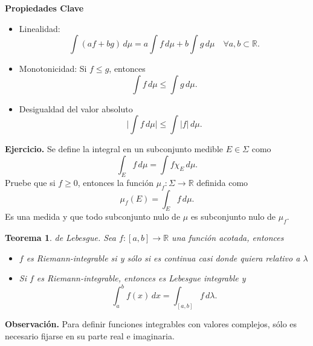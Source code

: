 \documentclass[letterpaper]{book}
\newtheorem{teorema}{Teorema}[section]
\newcommand{\exe}{{\noindent \sc \textbf{Ejercicio. }}}
\newcommand{\obs}{{\noindent \sc \textbf{Observación. }}}
\newcommand{\sig}{\ensuremath{\Sigma}}
\newcommand{\re}{\ensuremath{\mathbb R }}
\begin{document}
\noindent\textbf{Propiedades Clave}
\begin{itemize}
    \item Linealidad:
      \[
      \int (af + bg) \, d\mu = a\int f \, d\mu + b\int g \, d\mu\quad\forall{a,b}\subset\re.
      \]
    \item Monotonicidad: Si $f \leq g$, entonces
      \[
      \int f \, d\mu \leq \int g \, d\mu.
      \]
    \item Desigualdad del valor absoluto
      \[
      \Big|\int f \, d\mu\Big| \leq \int |f| \, d\mu.
      \]
\end{itemize}

\exe Se define la integral en un subconjunto medible $E\in\sig$ como
\[
\int_E f \, d\mu = \int f\chi_E\,d\mu.
\]
Pruebe que si $f\geq 0$, entonces la función $\mu_f:\sig\to\re$ definida como
\[
\mu_f(E)=\int_E f \, d\mu.
\]
Es una medida y que todo subconjunto nulo de $\mu$ es subconjunto nulo de $\mu_f$.
\begin{teorema}{de Lebesgue.}
Sea $f:[a,b]\to\re$ una función acotada, entonces
\begin{itemize}
  \item $f$ es Riemann-integrable si y sólo si es continua casi donde quiera relativo a $\lambda$
  \item  Si $f$ es Riemann-integrable, entonces es Lebesgue integrable y
\[
\int_a^b f(x) \, dx=\int_{[a,b]} f \, d\lambda.
\]
  \end{itemize}
\end{teorema}
\obs Para definir funciones integrables con valores complejos, sólo es necesario fijarse en su parte real e imaginaria.
\end{document}
